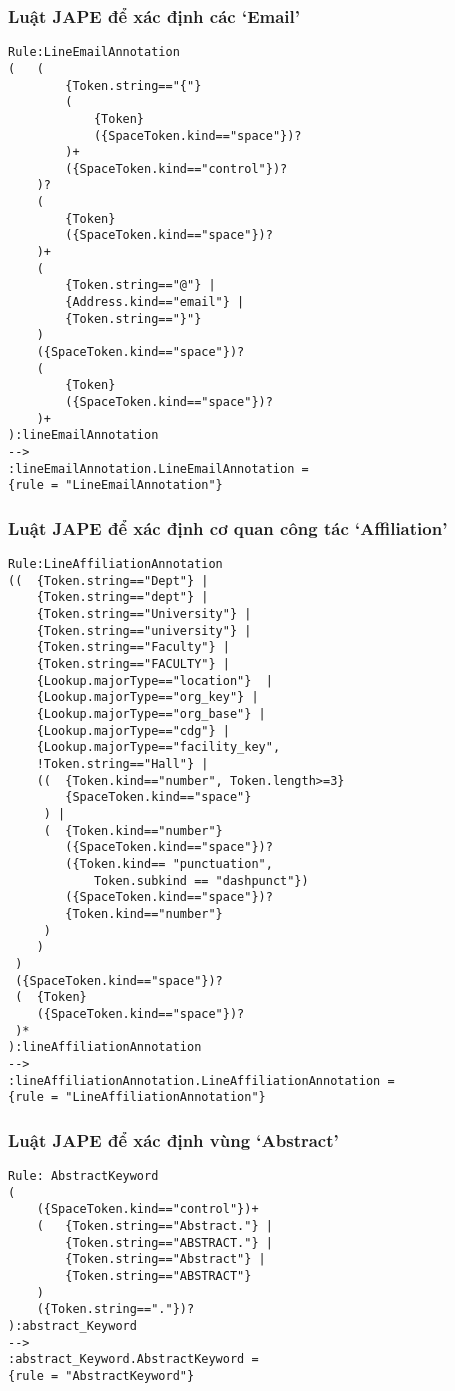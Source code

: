 \subsubsection*{Luật JAPE để xác định các `Email'}
\begin{lstlisting}[frame=single]
Rule:LineEmailAnnotation
(	(
		{Token.string=="{"}
		(
			{Token}
			({SpaceToken.kind=="space"})?
		)+
		({SpaceToken.kind=="control"})?
	)?
	(
		{Token}
		({SpaceToken.kind=="space"})?
	)+
	(
		{Token.string=="@"} | 
		{Address.kind=="email"} | 
		{Token.string=="}"}
	)
	({SpaceToken.kind=="space"})?
	(
		{Token}
		({SpaceToken.kind=="space"})?
	)+
):lineEmailAnnotation
-->
:lineEmailAnnotation.LineEmailAnnotation = 
{rule = "LineEmailAnnotation"}
\end{lstlisting}

\subsubsection*{Luật JAPE để xác định cơ quan công tác `Affiliation'}
\begin{lstlisting}[frame=single]
Rule:LineAffiliationAnnotation
((	{Token.string=="Dept"} | 
	{Token.string=="dept"} |
	{Token.string=="University"} | 
	{Token.string=="university"} |
	{Token.string=="Faculty"} | 
	{Token.string=="FACULTY"} |
	{Lookup.majorType=="location"}  |
	{Lookup.majorType=="org_key"} | 
	{Lookup.majorType=="org_base"} |
	{Lookup.majorType=="cdg"} | 
	{Lookup.majorType=="facility_key", 
	!Token.string=="Hall"} |
	((	{Token.kind=="number", Token.length>=3}
		{SpaceToken.kind=="space"}
	 ) |
	 (	{Token.kind=="number"}
		({SpaceToken.kind=="space"})?
		({Token.kind== "punctuation", 
			Token.subkind == "dashpunct"})
		({SpaceToken.kind=="space"})?
		{Token.kind=="number"}
	 )
	)
 )
 ({SpaceToken.kind=="space"})?
 (	{Token}
	({SpaceToken.kind=="space"})?
 )*
):lineAffiliationAnnotation
-->
:lineAffiliationAnnotation.LineAffiliationAnnotation = 
{rule = "LineAffiliationAnnotation"}
\end{lstlisting}

\subsubsection*{Luật JAPE để xác định vùng `Abstract'}
\begin{lstlisting}[frame=single]
Rule: AbstractKeyword
(   
	({SpaceToken.kind=="control"})+
	(	{Token.string=="Abstract."} | 
		{Token.string=="ABSTRACT."} |
		{Token.string=="Abstract"} | 
		{Token.string=="ABSTRACT"}
	)
	({Token.string=="."})?
):abstract_Keyword 
-->
:abstract_Keyword.AbstractKeyword = 
{rule = "AbstractKeyword"} 
\end{lstlisting}

